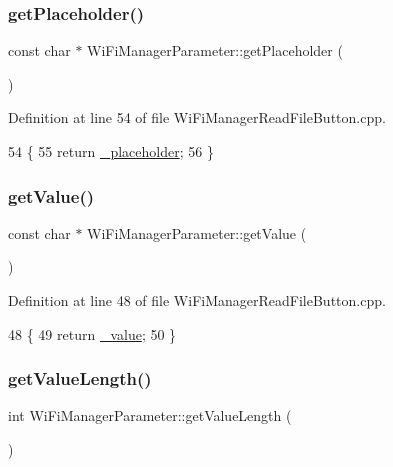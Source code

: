 \subsubsection{\texorpdfstring{get\+Placeholder()}{getPlaceholder()}}
{\footnotesize\ttfamily const char $\ast$ Wi\+Fi\+Manager\+Parameter\+::get\+Placeholder (\begin{DoxyParamCaption}{ }\end{DoxyParamCaption})}



Definition at line 54 of file Wi\+Fi\+Manager\+Read\+File\+Button.\+cpp.


\begin{DoxyCode}
54                                                  \{
55   \textcolor{keywordflow}{return} \hyperlink{class_wi_fi_manager_parameter_aceb6003c96280319fb19f83ebaf3034b}{\_placeholder};
56 \}
\end{DoxyCode}
\mbox{\label{class_wi_fi_manager_parameter_a23d23709f466ef1c3c2535a39016ec0f}} 
\subsubsection{\texorpdfstring{get\+Value()}{getValue()}}
{\footnotesize\ttfamily const char $\ast$ Wi\+Fi\+Manager\+Parameter\+::get\+Value (\begin{DoxyParamCaption}{ }\end{DoxyParamCaption})}



Definition at line 48 of file Wi\+Fi\+Manager\+Read\+File\+Button.\+cpp.


\begin{DoxyCode}
48                                            \{
49   \textcolor{keywordflow}{return} \hyperlink{class_wi_fi_manager_parameter_a80c6492e74603e4df46219b23580ecb6}{\_value};
50 \}
\end{DoxyCode}
\mbox{\label{class_wi_fi_manager_parameter_a51715af23f9c067a73cc45fab7953606}} 
\subsubsection{\texorpdfstring{get\+Value\+Length()}{getValueLength()}}
{\footnotesize\ttfamily int Wi\+Fi\+Manager\+Parameter\+::get\+Value\+Length (\begin{DoxyParamCaption}{ }\end{DoxyParamCaption})}




